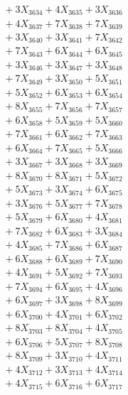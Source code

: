 \documentclass[a4paper,10pt]{article}
\begin{document}
{\begin{align}
&\;  + 3 X_{3634} + 4 X_{3635} + 3 X_{3636} \\[0.3ex]
&\;  + 4 X_{3637} + 7 X_{3638} + 7 X_{3639} \\[0.5ex]\allowbreak
&\;  + 3 X_{3640} + 3 X_{3641} + 7 X_{3642} \\[0.3ex]
&\;  + 7 X_{3643} + 6 X_{3644} + 6 X_{3645} \\[0.3ex]
&\;  + 3 X_{3646} + 3 X_{3647} + 3 X_{3648} \\[0.3ex]
&\;  + 7 X_{3649} + 3 X_{3650} + 5 X_{3651} \\[0.3ex]
&\;  + 5 X_{3652} + 6 X_{3653} + 6 X_{3654} \\[0.3ex]
&\;  + 8 X_{3655} + 7 X_{3656} + 7 X_{3657} \\[0.3ex]
&\;  + 6 X_{3658} + 5 X_{3659} + 5 X_{3660} \\[0.3ex]
&\;  + 7 X_{3661} + 6 X_{3662} + 7 X_{3663} \\[0.3ex]
&\;  + 6 X_{3664} + 7 X_{3665} + 5 X_{3666} \\[0.3ex]
&\;  + 3 X_{3667} + 3 X_{3668} + 3 X_{3669} \\[0.5ex]\allowbreak
&\;  + 8 X_{3670} + 8 X_{3671} + 5 X_{3672} \\[0.3ex]
&\;  + 5 X_{3673} + 3 X_{3674} + 6 X_{3675} \\[0.3ex]
&\;  + 3 X_{3676} + 5 X_{3677} + 7 X_{3678} \\[0.3ex]
&\;  + 5 X_{3679} + 6 X_{3680} + 4 X_{3681} \\[0.3ex]
&\;  + 7 X_{3682} + 6 X_{3683} + 3 X_{3684} \\[0.3ex]
&\;  + 4 X_{3685} + 7 X_{3686} + 6 X_{3687} \\[0.3ex]
&\;  + 6 X_{3688} + 6 X_{3689} + 7 X_{3690} \\[0.3ex]
&\;  + 4 X_{3691} + 5 X_{3692} + 7 X_{3693} \\[0.3ex]
&\;  + 7 X_{3694} + 6 X_{3695} + 4 X_{3696} \\[0.3ex]
&\;  + 6 X_{3697} + 3 X_{3698} + 8 X_{3699} \\[0.5ex]\allowbreak
&\;  + 6 X_{3700} + 4 X_{3701} + 6 X_{3702} \\[0.3ex]
&\;  + 8 X_{3703} + 8 X_{3704} + 4 X_{3705} \\[0.3ex]
&\;  + 6 X_{3706} + 5 X_{3707} + 8 X_{3708} \\[0.3ex]
&\;  + 8 X_{3709} + 3 X_{3710} + 4 X_{3711} \\[0.3ex]
&\;  + 4 X_{3712} + 3 X_{3713} + 4 X_{3714} \\[0.3ex]
&\;  + 4 X_{3715} + 6 X_{3716} + 6 X_{3717} \\[0.3ex]

\end{align}}
\end{document}
